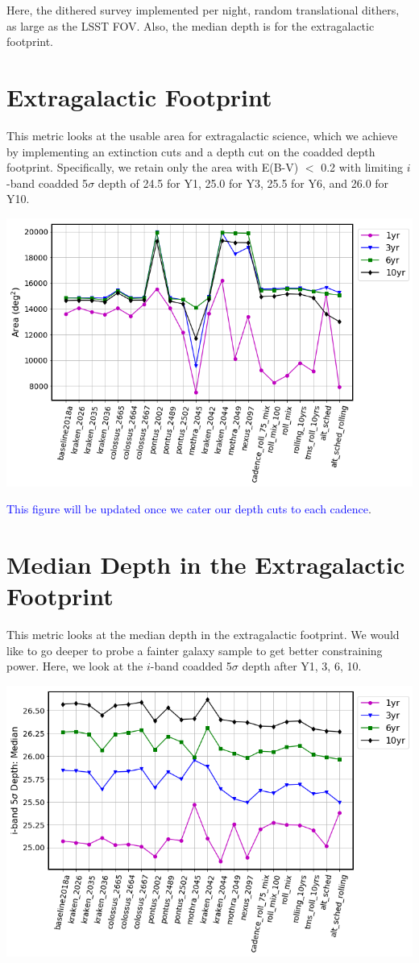\documentclass[a4paper,10pt]{article}
\newcommand{\clB}[1]{\textcolor{blue}{#1}}
\begin{document}
Here, the dithered survey implemented per night, random translational dithers, as large as the LSST FOV. Also, the median depth is for the extragalactic footprint.

\newpage
\section*{Extragalactic Footprint\label{area}}
This metric looks at the usable area for extragalactic science, which we achieve by implementing an extinction cuts and a depth cut on the coadded depth footprint.  Specifically, we retain only the area with E(B-V) $<$ 0.2 with limiting $i$-band coadded 5$\sigma$ depth of 24.5 for Y1, 25.0 for Y3, 25.5 for Y6, and 26.0 for Y10.

\begin{minipage}{\columnwidth}
\centering
 \includegraphics[width=.75\columnwidth]{lss_compare_area_22dbs.png}
\end{minipage}

\clB{This figure will be updated once we cater our depth cuts to each cadence}.

\newpage
\section*{Median Depth in the Extragalactic Footprint\label{median depth}}
This metric looks at the median depth in the extragalactic footprint. We would like to go deeper to probe a fainter galaxy sample to get better constraining power. Here, we look at the $i$-band coadded 5$\sigma$ depth after Y1, 3, 6, 10.

\begin{minipage}{\columnwidth}
\centering
 \includegraphics[width=.75\columnwidth]{lss_compare_depth_median_22dbs.png}
\end{minipage}
\end{document}
